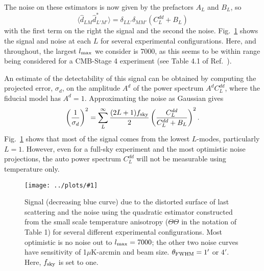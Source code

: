 \documentclass[prd,amsmath,amssymb,floatfix,superscriptaddress,nofootinbib,twocolumn]{revtex4-1}
\def\be{\begin{equation}}
\def\ee{\end{equation}}
\newcommand{\eql}[1]{\label{eq:#1}}
\newcommand{\sfig}[2]{
\texttt{[image: ../plots/\#1]}
        }
\newcommand{\Sfig}[2]{
   \begin{figure}[thbp]
   \begin{center}
    \sfig{#1.pdf}{\columnwidth}
    \caption{{\small #2}}
    \label{fig:#1}
     \end{center}
   \end{figure}
}
\newcommand{\rf}[1]{\ref{fig:#1}}
\newcommand{\scott}[1]{{\color{darkgreen} #1}}
\newcommand{\wh}[1]{{\color{red} #1}}
\begin{document}
The noise on these estimators is now given by the prefactors $A_L$ and $B_L$, so  
\be
\langle \hat d_{LM} \hat d^*_{L'M'}  \rangle = \delta_{LL'}\delta_{MM'} \left( C_L^{dd} + B_L \right)
\ee
with the first term on the right the signal and the second the noise. Fig.~\rf{Delay} shows the signal and noise at each $ L$ for several experimental configurations. Here, and throughout, the largest $l_{\rm max}$ we consider is 7000, as this seems to be within range being considered for a CMB-Stage 4 experiment (see Table 4.1 of Ref.~\cite{Abazajian:2016yjj}).

An estimate of the detectability of this signal can be obtained by computing the projected error, $\sigma_d$, on the amplitude $A^d$ of the power spectrum $A^dC_L^{dd}$, where the fiducial model has $A^d=1$.  Approximating the noise as Gaussian gives
\be
\left(\frac{1}{\sigma_d}\right)^2 = \sum_L^{\infty} \frac{(2L+1)f_{\rm sky}}{2} \left(\frac{C_L^{dd}}{C_L^{dd}+B_L}\right)^2\eql{sn}
.\ee
Fig.~\rf{Delay} shows that most of the signal comes from the lowest $L$-modes, particularly $L=1$. However, even for a full-sky experiment and the most optimistic noise projections, the
auto power spectrum $C_L^{dd}$ will not be measurable using temperature only.%

\Sfig{Delay}{Signal (decreasing blue curve) due to the distorted surface of last scattering and the noise using the quadratic estimator constructed from the small scale temperature anisotropy ($\Theta\Theta$ in the notation of Table 1) for several different experimental configurations. Most optimistic is no noise out to $l_{\rm max}=7000$; the other two noise curves have sensitivity of 1$\mu$K-arcmin and beam size. %
$\theta_{\rm FWHM}=1'$ or $4'$. Here, $f_{\rm sky}$ is set to one.} %
\end{document}
